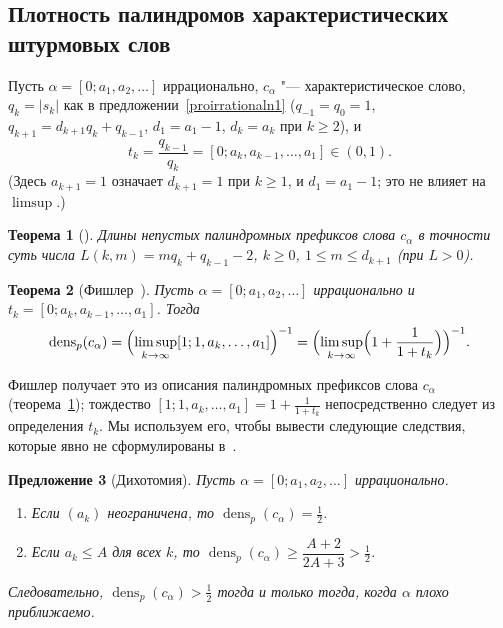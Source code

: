 \documentclass[a4paper,14pt]{extreport}
\theoremstyle{plain}
\newtheorem{theorem}{Теорема}[section]
\newtheorem{proposition}[theorem]{Предложение}
\theoremstyle{definition}
\theoremstyle{remark}
\begin{document}
\subsection{Плотность палиндромов характеристических штурмовых слов}\label{sec:palSturm}

Пусть $\alpha=[0;a_1,a_2,\dots]$ иррационально, $c_\alpha$ "--- характеристическое слово, $q_k=|s_k|$ как в
предложении~\ref{proirrationaln1} ($q_{-1}=q_0=1$, $q_{k+1}=d_{k+1}q_k+q_{k-1}$, $d_1=a_1-1$, $d_k=a_k$ при $k\ge2$), и
\begin{equation}
	t_k=\frac{q_{k-1}}{q_k}=[0;a_k,a_{k-1},\dots,a_1]\in(0,1).
\end{equation}
(Здесь $a_{k+1}=1$ означает $d_{k+1}=1$ при $k\ge1$, и $d_1=a_1-1$; это не влияет на $\limsup$.)

\begin{theorem}[\cite{DeLuca1997,Droubay,Fischler}]\label{ct:palprefSturm}
	Длины непустых палиндромных префиксов слова $c_\alpha$ в точности суть числа
	$L(k,m)=mq_k+q_{k-1}-2$, $k\ge0$, $1\le m\le d_{k+1}$ (при $L>0$).
\end{theorem}

\begin{theorem}[{Фишлер~\cite[формула~(1), разд.~3.1]{Fischler}}]\label{thm:palSturm}
	Пусть $\alpha=[0;a_1,a_2,\dots]$ иррационально и $t_k=[0;a_k,a_{k-1},\dots,a_1]$. Тогда
	\begin{equation}
		\operatorname{dens}_p(c_\alpha)=\Bigl(\limsup_{k\to\infty}[1;1,a_k,\dots,a_1]\Bigr)^{-1}
		=\Bigl(\limsup_{k\to\infty}\Bigl(1+\frac1{1+t_k}\Bigr)\Bigr)^{-1}.
	\end{equation}
\end{theorem}

\noindent Фишлер получает это из описания палиндромных префиксов слова $c_\alpha$ (теорема~\ref{ct:palprefSturm}); тождество $[1;1,a_k,\dots,a_1]=1+\frac1{1+t_k}$ непосредственно следует из определения $t_k$. Мы используем его, чтобы вывести следующие следствия, которые явно не сформулированы в~\cite{Fischler}.

\begin{proposition}[Дихотомия]\label{prop:dichotomy}
	Пусть $\alpha=[0;a_1,a_2,\dots]$ иррационально.
	\begin{enumerate}
		\item Если $(a_k)$ неограничена, то $\operatorname{dens}_p(c_\alpha)=\tfrac12$.
		\item Если $a_k\le A$ для всех $k$, то $\operatorname{dens}_p(c_\alpha)\ge\dfrac{A+2}{2A+3}>\tfrac12$.
	\end{enumerate}
	Следовательно, $\operatorname{dens}_p(c_\alpha)>\tfrac12$ тогда и только тогда, когда $\alpha$ плохо приближаемо.
\end{proposition}
\end{document}
